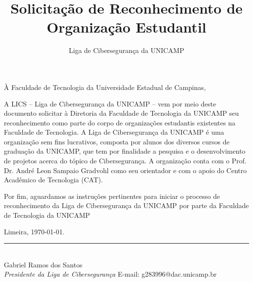 \documentclass[12pt, a4paper]{article}
\title{Solicitação de Reconhecimento de Organização Estudantil}
\author{Liga de Cibersegurança da UNICAMP}
\begin{document}
\maketitle

À Faculdade de Tecnologia da Universidade Estadual de Campinas,

\vspace{0.5cm}

A LICS -- Liga de Cibersegurança da UNICAMP -- vem por meio deste documento solicitar à Diretoria da Faculdade de Tecnologia da UNICAMP seu reconhecimento como parte do corpo de organizações estudantis existentes na Faculdade de Tecnologia. A Liga de Cibersegurança da UNICAMP é uma organização sem fins lucrativos, composta por alunos dos diversos cursos de graduação da UNICAMP, que tem por finalidade a pesquisa e o desenvolvimento de projetos acerca do tópico de Cibersegurança. A organização conta com o Prof. Dr. André Leon Sampaio Gradvohl como seu orientador e com o apoio do Centro Acadêmico de Tecnologia (CAT).

\vspace{0.5cm}

Por fim, aguardamos as instruções pertinentes para iniciar o processo de reconhecimento da Liga de Cibersegurança da UNICAMP por parte da Faculdade de Tecnologia da UNICAMP

\bigskip
\bigskip
\begin{center}
    Limeira, \today.
\end{center}

\vspace*{\fill}

\begin{center}
    \begin{minipage}{0.45\textwidth}
        \centering
        \rule{6cm}{0.4pt} \\
        Gabriel Ramos dos Santos \\
        \textit{Presidente da Liga de Cibersegurança}
        E-mail: g283996@dac.unicamp.br
    \end{minipage}
\end{center}
\end{document}
